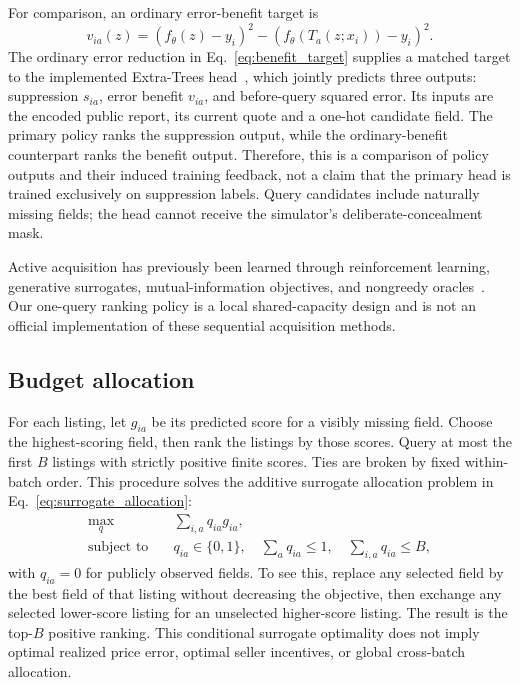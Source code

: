 \documentclass[10pt,journal]{IEEEtran}
\begin{document}
For comparison, an ordinary error-benefit target is
\begin{equation}
v_{ia}(z)=(f_\theta(z)-y_i)^2
-(f_\theta(T_a(z;x_i))-y_i)^2.
\label{eq:benefit_target}
\end{equation}
The ordinary error reduction in Eq.~\eqref{eq:benefit_target} supplies a
matched target to the implemented Extra-Trees head~\cite{geurts2006extratrees},
which jointly predicts
three outputs: suppression $s_{ia}$, error benefit $v_{ia}$, and before-query
squared error. Its inputs are the encoded public report, its current quote
and a one-hot candidate field. The primary policy ranks the suppression
output, while the ordinary-benefit counterpart ranks the benefit output.
Therefore, this is a comparison of policy outputs and their induced training
feedback, not a claim that the primary head is trained exclusively on
suppression labels. Query candidates include naturally missing fields; the
head cannot receive the simulator's deliberate-concealment mask.

Active acquisition has previously been learned through reinforcement
learning, generative surrogates, mutual-information objectives, and
nongreedy oracles~\cite{janisch2019costly,li2021gsm,covert2023information,valancius2024aco}.
Our one-query ranking policy is a local shared-capacity design and is not an
official implementation of these sequential acquisition methods.

\subsection{Budget allocation}
For each listing, let $g_{ia}$ be its predicted score for a visibly missing
field. Choose the highest-scoring field, then rank the listings by those
scores. Query at most the first $B$ listings with strictly positive finite
scores. Ties are broken by fixed within-batch order. This procedure solves
the additive surrogate allocation problem in Eq.~\eqref{eq:surrogate_allocation}:
\begin{align}
\max_{q}\quad &\sum_{i,a}q_{ia}g_{ia},\nonumber\\
\text{subject to}\quad &q_{ia}\in\{0,1\},\quad
\sum_a q_{ia}\leq1,\quad\sum_{i,a}q_{ia}\leq B,
\label{eq:surrogate_allocation}
\end{align}
with $q_{ia}=0$ for publicly observed fields. To see this, replace any selected
field by the best field of that listing without decreasing the objective,
then exchange any selected lower-score listing for an unselected
higher-score listing. The result is the top-$B$ positive ranking.
This conditional surrogate optimality does not imply optimal realized price
error, optimal seller incentives, or global cross-batch allocation.
\end{document}
